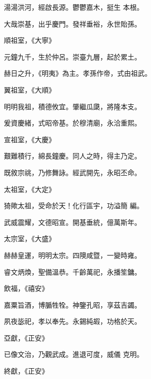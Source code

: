 \begin{pinyinscope}
 湯湯洪河，經啟長源。鬱鬱嘉木，挺生
 本根。



 大哉崇基，出乎慶門。發祥垂裕，永世貽孫。



 順祖室，《大寧》



 元鐘九千，生於仲呂。崇臺九層，起於累土。



 赫日之升，《明夷》為主。孝孫作帝，式由祖武。



 翼祖室，《大順》



 明明我祖，積德攸宜。肇繼瓜瓞，將隆本支。



 爰資慶緒，式昭帝基。於穆清廟，永洽重熙。



 宣祖室，《大慶》



 艱難積行，綿長鐘慶。同人之時，得主乃定。



 既敘宗祧，乃修舞詠。經武開先，永昭丕命。



 太祖室，《大定》



 猗歟太祖，受命於天！化行區宇，功溢簡
 編。



 武威震耀，文德昭宣。開基垂統，億萬斯年。



 太宗室，《大盛》



 赫赫皇運，明明太宗。四隩咸暨，一變時雍。



 睿文炳煥，聖備溫恭。千齡萬祀，永播笙鏞。



 飲福，《禧安》



 嘉粟旨酒，博腯牲牷。神鑒孔昭，享茲吉蠲。



 夙夜毖祀，孝以奉先。永錫純嘏，功格於天。



 亞獻，《正安》



 已像文治，乃觀武成。進退可度，威儀
 克明。



 終獻，《正安》




\end{pinyinscope}
